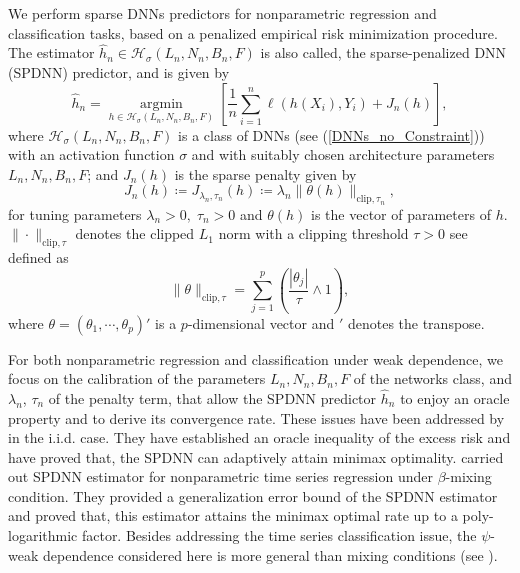 \documentclass[10pt,twoside]{article}
\numberwithin{equation}{section}
\DeclareMathOperator*{\argmin}{argmin}
\begin{document}
\noindent We perform sparse DNNs predictors for nonparametric regression  and classification tasks, based on a penalized empirical risk minimization procedure.
%
The estimator $\widehat{h}_n \in \mathcal{H}_{\sigma}(L_n, N_n, B_n, F) $ is also called, the sparse-penalized DNN (SPDNN) predictor, and is given by 
%
\begin{equation}\label{sparse_DNNs_Estimators}
\widehat{h}_n = \underset{h \in \mathcal{H}_{\sigma}(L_n, N_n, B_n, F)}{\argmin} \left[ \dfrac{1}{n} \sum_{i=1}^{n} \ell(h(X_i), Y_i) + J_n(h) \right],
\end{equation}
%
where $\mathcal{H}_{\sigma}(L_n, N_n, B_n, F) $ is a class of DNNs (see (\ref{DNNs_no_Constraint})) with an activation function $\sigma$ and with suitably chosen architecture parameters $L_n, N_n, B_n, F$; and
% 
 $J_ {n} (h) $ is the sparse penalty given by 
%
\[ J_ {n} (h) \coloneqq J_ {\lambda_ {n}, \tau_ {n}} (h) \coloneqq \lambda_ {n} \|\theta(h) \|_ {\text{clip}, \tau_ {n}},  \]  
%
for tuning parameters $\lambda_ {n} > 0, \; \tau_ {n} > 0$ and $\theta(h)$ is the vector of parameters of $h$. 
%
$\| \cdot \|_{\text{clip}, \tau} $ denotes the clipped $ L_1$ norm  with a 
  clipping threshold $ \tau > 0$ see \cite{zhang2010analysis} defined as 
%
\[ \| \theta \|_{\text{clip}, \tau} =  \sum_{j=1}^{p}\left(\frac{|\theta_{j}|}{\tau}\land 
  1\right), \] 
%
where $\theta= (\theta_1, \cdots, \theta_ p)' $ is a  $p$-dimensional 
  vector and $'$ denotes the transpose. 
%

\medskip

For both nonparametric regression and classification under weak dependence, 
we focus on the calibration of the parameters $L_n, N_n, B_n, F$ of the networks class, and $\lambda_n$, $\tau_n$ of the penalty term, that allow the SPDNN predictor $\widehat{h}_n$ to enjoy an oracle property and to derive its convergence rate.
%
These issues have been addressed by \cite{ohn2022nonconvex} in the i.i.d. case.
%
They have established an oracle inequality of the excess risk 
and have proved that, the SPDNN can adaptively attain minimax optimality.
%
\cite{kurisu2022adaptive} carried out SPDNN estimator for nonparametric time series regression under $\beta$-mixing condition.
%
They provided a generalization error bound of the SPDNN estimator and proved that, this estimator attains the minimax optimal rate up to a poly-logarithmic factor.
Besides addressing the time series classification issue, the $\psi$-weak dependence considered here is more general than mixing conditions (see \cite{dedecker2007weak}).
 
\end{document}
